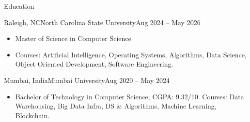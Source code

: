 \documentclass[]{mcdowellcv}
\begin{document}
\begin{cvsection}{Education}
  \begin{cvsubsection}{Raleigh, NC}{North Carolina State University}{Aug 2024 -- May 2026}
    \begin{itemize}
      \item Master of Science in Computer Science
      \item Courses: Artificial Intelligence, Operating Systems, Algorithms, Data Science, Object Oriented Development, Software Engineering.
    \end{itemize}
    \vspace{-1.5pt}
  \end{cvsubsection}

  \begin{cvsubsection}{Mumbai, India}{Mumbai University}{Aug 2020 -- May 2024}
    \begin{itemize}
      \item Bachelor of Technology in Computer Science; CGPA: 9.32/10. Courses: Data Warehousing, Big Data Infra, DS \& Algorithms, Machine Learning, Blockchain.
    \end{itemize}
    \vspace{-1.5pt}
  \end{cvsubsection}
\end{cvsection}
\end{document}
